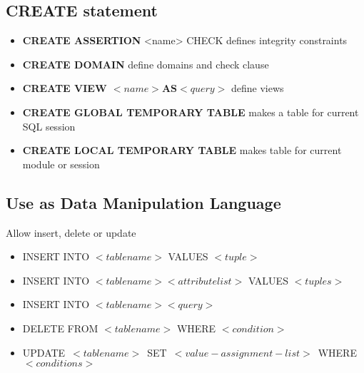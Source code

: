 \documentclass{article}
\begin{document}
	\subsection{CREATE statement}
		\begin{itemize}
			\item \textbf{CREATE ASSERTION} <name> CHECK defines integrity constraints
			\item \textbf{CREATE DOMAIN} define domains and check clause
			\item \textbf{CREATE VIEW $<name> \textbf{AS} <query>$} define views
			\item \textbf{CREATE GLOBAL TEMPORARY TABLE} makes a table for current SQL session
			\item \textbf{CREATE LOCAL TEMPORARY TABLE} makes table for current module or session
		\end{itemize}

	\subsection{Use as Data Manipulation Language}
		Allow insert, delete or update

		\begin{itemize}
			\item INSERT INTO $<tablename>$ VALUES $<tuple>$
			\item INSERT INTO $<tablename> <attributelist>$ VALUES $<tuples>$
			\item INSERT INTO $<tablename> <query>$
			\item DELETE FROM $<tablename>$ WHERE $<condition>$
			\item \mbox{UPDATE $<tablename>$ SET $<value-assignment-list>$ WHERE $<conditions>$}
		\end{itemize}
\end{document}

